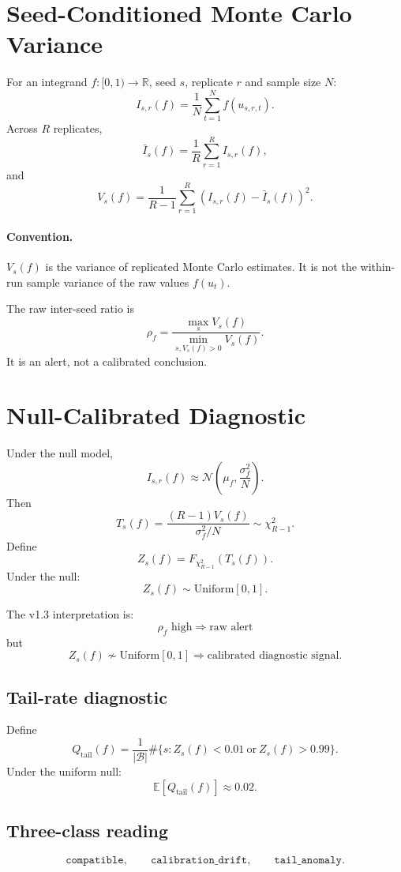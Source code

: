 \documentclass[11pt,a4paper]{article}
\newcommand{\Unif}{\mathrm{Uniform}}
\newcommand{\Qtail}{Q_{\mathrm{tail}}}
\begin{document}
\section{Seed-Conditioned Monte Carlo Variance}

For an integrand $f:[0,1)\to\mathbb R$, seed $s$, replicate $r$ and sample size $N$:
\[
I_{s,r}(f)=\frac1N\sum_{t=1}^{N}f(u_{s,r,t}).
\]
Across $R$ replicates,
\[
\bar I_s(f)=\frac1R\sum_{r=1}^{R}I_{s,r}(f),
\]
and
\[
\boxed{
V_s(f)
=
\frac1{R-1}
\sum_{r=1}^{R}
\left(I_{s,r}(f)-\bar I_s(f)\right)^2.
}
\]

\paragraph{Convention.}
$V_s(f)$ is the variance of replicated Monte Carlo estimates. It is not the within-run sample variance of the raw values $f(u_t)$.

The raw inter-seed ratio is
\[
\rho_f
=
\frac{\max_s V_s(f)}
{\min_{s,V_s(f)>0}V_s(f)}.
\]
It is an alert, not a calibrated conclusion.

\section{Null-Calibrated Diagnostic}

Under the null model,
\[
I_{s,r}(f)\approx
\mathcal N\left(\mu_f,\frac{\sigma_f^2}{N}\right).
\]
Then
\[
T_s(f)
=
\frac{(R-1)V_s(f)}{\sigma_f^2/N}
\sim\chi^2_{R-1}.
\]
Define
\[
\boxed{
Z_s(f)=F_{\chi^2_{R-1}}\left(T_s(f)\right).
}
\]
Under the null:
\[
\boxed{
Z_s(f)\sim\Unif[0,1].
}
\]

The v1.3 interpretation is:
\[
\boxed{
\rho_f\text{ high}\Rightarrow\text{raw alert}
}
\]
but
\[
\boxed{
Z_s(f)\not\sim\Unif[0,1]\Rightarrow\text{calibrated diagnostic signal.}
}
\]

\subsection{Tail-rate diagnostic}

Define
\[
\Qtail(f)
=
\frac1{|\mathcal B|}
\#\{s:Z_s(f)<0.01\ \text{or}\ Z_s(f)>0.99\}.
\]
Under the uniform null:
\[
\mathbb E[\Qtail(f)]\approx0.02.
\]

\subsection{Three-class reading}

\[
\boxed{
\texttt{compatible},\qquad
\texttt{calibration\_drift},\qquad
\texttt{tail\_anomaly}.
}
\]
\end{document}
